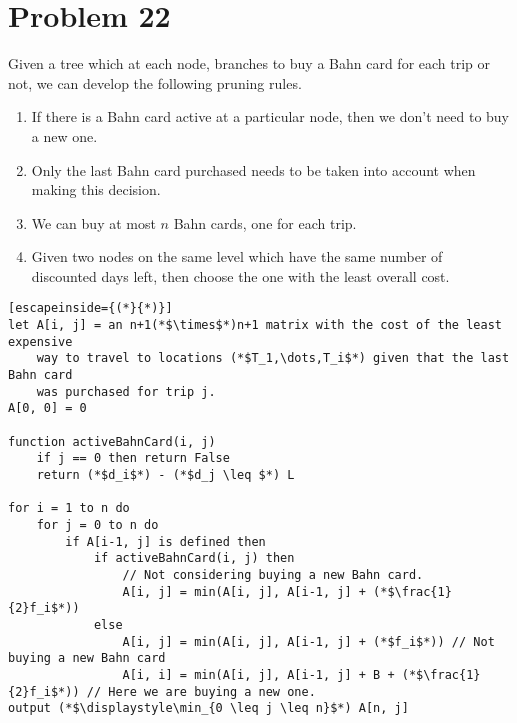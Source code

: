 \documentclass{article}
\providecommand{\prob}[1]{\section*{Problem #1}}
\begin{document}
    \pagebreak
    \prob{22}
    Given a tree which at each node, branches to buy a Bahn card for each trip or not, we can develop the following pruning rules.
    \begin{enumerate}
        \item If there is a Bahn card active at a particular node, then we don't need to buy a new one.
        \item Only the last Bahn card purchased needs to be taken into account when making this decision.
        \item We can buy at most $n$ Bahn cards, one for each trip.
        \item Given two nodes on the same level which have the same number of discounted days left, then choose the one with the least overall cost.
    \end{enumerate}

    \begin{lstlisting}[escapeinside={(*}{*)}]
let A[i, j] = an n+1(*$\times$*)n+1 matrix with the cost of the least expensive
    way to travel to locations (*$T_1,\dots,T_i$*) given that the last Bahn card
    was purchased for trip j.
A[0, 0] = 0

function activeBahnCard(i, j)
    if j == 0 then return False
    return (*$d_i$*) - (*$d_j \leq $*) L

for i = 1 to n do
    for j = 0 to n do
        if A[i-1, j] is defined then
            if activeBahnCard(i, j) then
                // Not considering buying a new Bahn card.
                A[i, j] = min(A[i, j], A[i-1, j] + (*$\frac{1}{2}f_i$*))
            else
                A[i, j] = min(A[i, j], A[i-1, j] + (*$f_i$*)) // Not buying a new Bahn card
                A[i, i] = min(A[i, j], A[i-1, j] + B + (*$\frac{1}{2}f_i$*)) // Here we are buying a new one.
output (*$\displaystyle\min_{0 \leq j \leq n}$*) A[n, j]
    \end{lstlisting}
\end{document}
